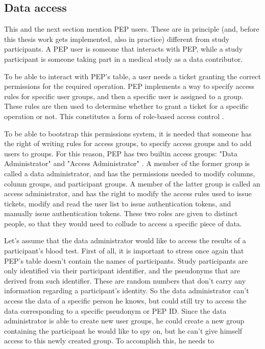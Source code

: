 \documentclass{report}
\begin{document}
\subsection{Data access} \label{data_access}
This and the next section mention PEP users. These are in principle (and, before this thesis work gets implemented, also in  practice) different from study participants. A PEP user is
someone that interacts with PEP, while a study participant is someone taking part in a medical study as a data contributor. \par
To be able to interact with PEP's table, a user needs a ticket granting the correct permissions for the required operation. PEP implements a way to specify access rules for
specific user groups, and then a specific user is assigned to a group. These rules are then used to determine whether to grant a ticket for a specific operation or not. This
constitutes a form of role-based access control \cite{rbac}. \par
To be able to bootstrap this permissions system, it is needed that someone has the right of writing rules for access groups, to specify access groups and to add users to groups. For 
this reason, PEP has two builtin access groups: "Data Administrator" and "Access Administrator" \cite{pep-blueprint}. A member of the former group is called a data administrator, and 
has the permissions needed to modify columns, column groups, and participant groups. A member of the latter group is called an access administrator, and has the right to modify the 
access rules used to issue tickets, modify and read the user list to issue authentication tokens, and manually issue authentication tokens. These two roles are given to distinct people, 
so that they would need to collude to access a specific piece of data. \par
Let's assume that the data administrator would like to access the results of a participant's blood test. First of 
all, it is important to stress once again that PEP's table doesn't contain the names of participants. Study participants are only identified via their participant identifier, and the 
pseudonyms that are derived from such identifier. These are random numbers that don't carry any information regarding a participant's identity. So the data administrator can't access 
the data of a specific person he knows, but could still try to access the data corresponding to a specific pseudonym or PEP ID. Since the data administrator is able to create new user 
groups, he could create a new group containing the participant he would like to spy on, but he can't give himself access to this newly created group. To accomplish this, he needs to 
\end{document}
